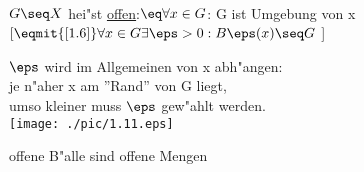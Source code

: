 \begin{definition}\label{1.11}\\
$G\seq X$ hei"st \ul{offen}:$\eq \forall x\in G$: G ist Umgebung von x\\
 $[\eqmit{\ref{1.6}} \forall x\in G\exists \eps >0:B\eps (x)\seq G$ ]
\end{definition}
$\eps$ wird im Allgemeinen von x abh"angen:\\ je n"aher x am ''Rand'' von G liegt,\\ umso kleiner muss $\eps$ gew"ahlt werden.
\vspace*{-3.7cm}\\
\hspace*{10cm}\texttt{[image: ./pic/1.11.eps]}
\begin{prop}\label{1.12}{offene B"alle sind offene Mengen}
\end{prop}

